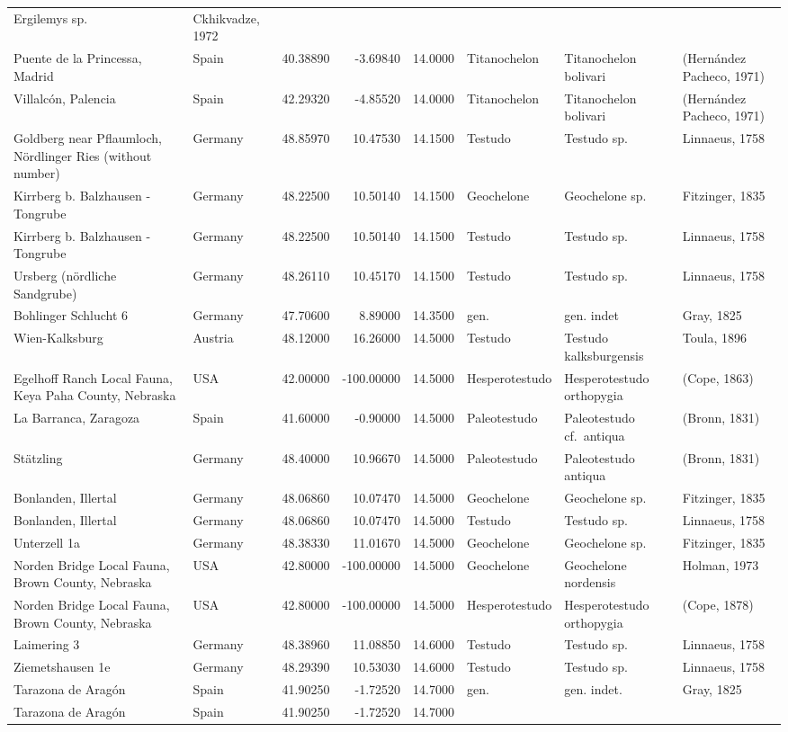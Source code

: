 \documentclass[]{article}
\begin{document}
\begin{longtable}[]{@{}llrrrlll@{}}
Ergilemys sp. & Ckhikvadze, 1972\tabularnewline
Puente de la Princessa, Madrid & Spain & 40.38890 & -3.69840 & 14.0000 &
Titanochelon & Titanochelon bolivari & (Hernández Pacheco,
1971)\tabularnewline
Villalcón, Palencia & Spain & 42.29320 & -4.85520 & 14.0000 &
Titanochelon & Titanochelon bolivari & (Hernández Pacheco,
1971)\tabularnewline
Goldberg near Pflaumloch, Nördlinger Ries (without number) & Germany &
48.85970 & 10.47530 & 14.1500 & Testudo & Testudo sp. & Linnaeus,
1758\tabularnewline
Kirrberg b. Balzhausen - Tongrube & Germany & 48.22500 & 10.50140 &
14.1500 & Geochelone & Geochelone sp. & Fitzinger, 1835\tabularnewline
Kirrberg b. Balzhausen - Tongrube & Germany & 48.22500 & 10.50140 &
14.1500 & Testudo & Testudo sp. & Linnaeus, 1758\tabularnewline
Ursberg (nördliche Sandgrube) & Germany & 48.26110 & 10.45170 & 14.1500
& Testudo & Testudo sp. & Linnaeus, 1758\tabularnewline
Bohlinger Schlucht 6 & Germany & 47.70600 & 8.89000 & 14.3500 & gen. &
gen. indet & Gray, 1825\tabularnewline
Wien-Kalksburg & Austria & 48.12000 & 16.26000 & 14.5000 & Testudo &
Testudo kalksburgensis & Toula, 1896\tabularnewline
Egelhoff Ranch Local Fauna, Keya Paha County, Nebraska & USA & 42.00000
& -100.00000 & 14.5000 & Hesperotestudo & Hesperotestudo orthopygia &
(Cope, 1863)\tabularnewline
La Barranca, Zaragoza & Spain & 41.60000 & -0.90000 & 14.5000 &
Paleotestudo & Paleotestudo cf.~antiqua & (Bronn, 1831)\tabularnewline
Stätzling & Germany & 48.40000 & 10.96670 & 14.5000 & Paleotestudo &
Paleotestudo antiqua & (Bronn, 1831)\tabularnewline
Bonlanden, Illertal & Germany & 48.06860 & 10.07470 & 14.5000 &
Geochelone & Geochelone sp. & Fitzinger, 1835\tabularnewline
Bonlanden, Illertal & Germany & 48.06860 & 10.07470 & 14.5000 & Testudo
& Testudo sp. & Linnaeus, 1758\tabularnewline
Unterzell 1a & Germany & 48.38330 & 11.01670 & 14.5000 & Geochelone &
Geochelone sp. & Fitzinger, 1835\tabularnewline
Norden Bridge Local Fauna, Brown County, Nebraska & USA & 42.80000 &
-100.00000 & 14.5000 & Geochelone & Geochelone nordensis & Holman,
1973\tabularnewline
Norden Bridge Local Fauna, Brown County, Nebraska & USA & 42.80000 &
-100.00000 & 14.5000 & Hesperotestudo & Hesperotestudo orthopygia &
(Cope, 1878)\tabularnewline
Laimering 3 & Germany & 48.38960 & 11.08850 & 14.6000 & Testudo &
Testudo sp. & Linnaeus, 1758\tabularnewline
Ziemetshausen 1e & Germany & 48.29390 & 10.53030 & 14.6000 & Testudo &
Testudo sp. & Linnaeus, 1758\tabularnewline
Tarazona de Aragón & Spain & 41.90250 & -1.72520 & 14.7000 & gen. & gen.
indet. & Gray, 1825\tabularnewline
Tarazona de Aragón & Spain & 41.90250 & -1.72520 & 14.7000 &

\end{longtable}
\end{document}
